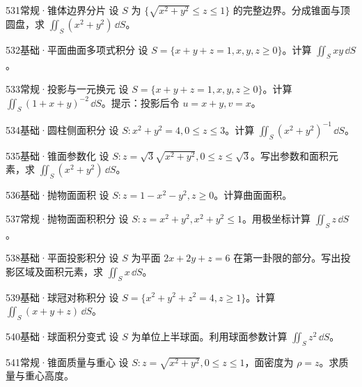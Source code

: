 \begin{exercise}{531}{常规·锥体边界分片}
设 $S$ 为 $\{\sqrt{x^2+y^2}\leq z\leq1\}$ 的完整边界。分成锥面与顶圆盘，求 $\iint_S(x^2+y^2)\,\dd S$。
\end{exercise}
\begin{exercise}{532}{基础·平面曲面多项式积分}
设 $S=\{x+y+z=1,x,y,z\geq0\}$。计算 $\iint_Sxy\,\dd S$。
\end{exercise}
\begin{exercise}{533}{常规·投影与一元换元}
设 $S=\{x+y+z=1,x,y,z\geq0\}$。计算 $\iint_S(1+x+y)^{-2}\,\dd S$。提示：投影后令 $u=x+y,v=x$。
\end{exercise}
\begin{exercise}{534}{基础·圆柱侧面积分}
设 $S:x^2+y^2=4,0\leq z\leq3$。计算 $\iint_S(x^2+y^2)^{-1}\,\dd S$。
\end{exercise}
\begin{exercise}{535}{基础·锥面参数化}
设 $S:z=\sqrt3\sqrt{x^2+y^2},0\leq z\leq\sqrt3$。写出参数和面积元素，求 $\iint_S(x^2+y^2)\,\dd S$。
\end{exercise}
\begin{exercise}{536}{基础·抛物面面积}
设 $S:z=1-x^2-y^2,z\geq0$。计算曲面面积。
\end{exercise}
\begin{exercise}{537}{常规·抛物面面积积分}
设 $S:z=x^2+y^2,x^2+y^2\leq1$。用极坐标计算 $\iint_Sz\,\dd S$。
\end{exercise}
\begin{exercise}{538}{基础·平面投影积分}
设 $S$ 为平面 $2x+2y+z=6$ 在第一卦限的部分。写出投影区域及面积元素，求 $\iint_Sx\,\dd S$。
\end{exercise}
\begin{exercise}{539}{基础·球冠对称积分}
设 $S=\{x^2+y^2+z^2=4,z\geq1\}$。计算 $\iint_S(x+y+z)\,\dd S$。
\end{exercise}
\begin{exercise}{540}{基础·球面积分变式}
设 $S$ 为单位上半球面。利用球面参数计算 $\iint_Sz^2\,\dd S$。
\end{exercise}
\begin{exercise}{541}{常规·锥面质量与重心}
设 $S:z=\sqrt{x^2+y^2},0\leq z\leq1$，面密度为 $\rho=z$。求质量与重心高度。
\end{exercise}
